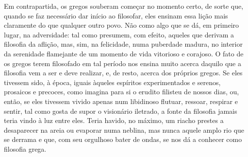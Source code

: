 Em contrapartida, os gregos souberam começar no momento certo, de sorte
que, quando se faz necessário dar início ao filosofar, eles ensinam
essa lição mais claramente do que qualquer outro povo. Não como algo
que se dá, em primeiro lugar, na adversidade: tal como presumem, com
efeito, aqueles que derivam a filosofia da aflição, mas, sim, na
felicidade, numa puberdade madura, no interior da serenidade flamejante
de um momento de vida vitorioso e corajoso. O fato de os gregos terem
filosofado em tal período nos ensina muito acerca daquilo que a
filosofia vem a ser e deve realizar, e, de resto, acerca dos próprios
gregos. Se eles tivessem sido, à época, iguais àqueles espíritos
experimentados e serenos, prosaicos e precoces, como imagina para si o
erudito filisteu de nossos dias, ou, então, se eles tivessem vivido
apenas num libidinoso flutuar, ressoar, respirar e sentir, tal como
gosta de supor o visionário iletrado, a fonte da filosofia jamais teria
vindo à luz entre eles. Teria havido, no máximo, um riacho prestes a
desaparecer na areia ou evaporar numa neblina, mas nunca aquele amplo
rio que se derrama e que, com seu orgulhoso bater de ondas, se nos dá a
conhecer como filosofia grega.

